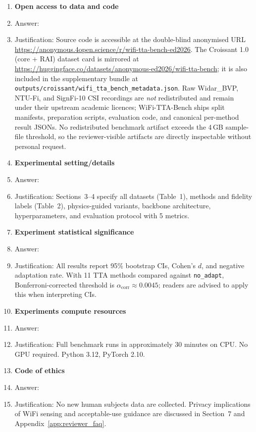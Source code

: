 \begin{enumerate}
\item {\bf Open access to data and code}
    \item[] Answer: \answerYes{}
    \item[] Justification: Source code is accessible at the double-blind anonymised URL \url{https://anonymous.4open.science/r/wifi-tta-bench-ed2026}. The Croissant 1.0 (core + RAI) dataset card is mirrored at \url{https://huggingface.co/datasets/anonymous-ed2026/wifi-tta-bench}; it is also included in the supplementary bundle at \texttt{outputs/croissant/wifi\_tta\_bench\_metadata.json}. Raw Widar\_BVP, NTU-Fi, and SignFi-10 CSI recordings are \emph{not} redistributed and remain under their upstream academic licences; WiFi-TTA-Bench ships split manifests, preparation scripts, evaluation code, and canonical per-method result JSONs. No redistributed benchmark artifact exceeds the 4\,GB sample-file threshold, so the reviewer-visible artifacts are directly inspectable without personal request.

\item {\bf Experimental setting/details}
    \item[] Answer: \answerYes{}
    \item[] Justification: Sections~3--4 specify all datasets (Table~1), methods and fidelity labels (Table~2), physics-guided variants, backbone architecture, hyperparameters, and evaluation protocol with 5 metrics.

\item {\bf Experiment statistical significance}
    \item[] Answer: \answerYes{}
    \item[] Justification: All results report 95\% bootstrap CIs, Cohen's $d$, and negative adaptation rate. With 11 TTA methods compared against \texttt{no\_adapt}, Bonferroni-corrected threshold is $\alpha_{\text{corr}} \approx 0.0045$; readers are advised to apply this when interpreting CIs.

\item {\bf Experiments compute resources}
    \item[] Answer: \answerYes{}
    \item[] Justification: Full benchmark runs in approximately 30 minutes on CPU. No GPU required. Python 3.12, PyTorch 2.10.

\item {\bf Code of ethics}
    \item[] Answer: \answerYes{}
    \item[] Justification: No new human subjects data are collected. Privacy implications of WiFi sensing and acceptable-use guidance are discussed in Section~7 and Appendix~\ref{app:reviewer_faq}.


\end{enumerate}
